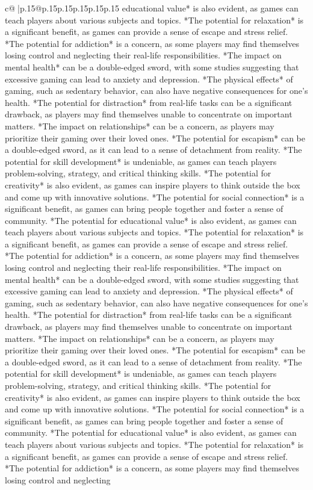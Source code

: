\documentclass{article}
\begin{document}
{\begin{supertabular}{c@{$\;$}|p{.15\linewidth}@{}p{.15\linewidth}p{.15\linewidth}p{.15\linewidth}p{.15\linewidth}p{.15\linewidth}}
{{{educational value* is also evident, as games can teach players about various subjects and topics. *The potential for relaxation* is a significant benefit, as games can provide a sense of escape and stress relief. *The potential for addiction* is a concern, as some players may find themselves losing control and neglecting their real{-}life responsibilities. *The impact on mental health* can be a double{-}edged sword, with some studies suggesting that excessive gaming can lead to anxiety and depression. *The physical effects* of gaming, such as sedentary behavior, can also have negative consequences for one's health. *The potential for distraction* from real{-}life tasks can be a significant drawback, as players may find themselves unable to concentrate on important matters. *The impact on relationships* can be a concern, as players may prioritize their gaming over their loved ones. *The potential for escapism* can be a double{-}edged sword, as it can lead to a sense of detachment from reality. *The potential for skill development* is undeniable, as games can teach players problem{-}solving, strategy, and critical thinking skills. *The potential for creativity* is also evident, as games can inspire players to think outside the box and come up with innovative solutions. *The potential for social connection* is a significant benefit, as games can bring people together and foster a sense of community. *The potential for educational value* is also evident, as games can teach players about various subjects and topics. *The potential for relaxation* is a significant benefit, as games can provide a sense of escape and stress relief. *The potential for addiction* is a concern, as some players may find themselves losing control and neglecting their real{-}life responsibilities. *The impact on mental health* can be a double{-}edged sword, with some studies suggesting that excessive gaming can lead to anxiety and depression. *The physical effects* of gaming, such as sedentary behavior, can also have negative consequences for one's health. *The potential for distraction* from real{-}life tasks can be a significant drawback, as players may find themselves unable to concentrate on important matters. *The impact on relationships* can be a concern, as players may prioritize their gaming over their loved ones. *The potential for escapism* can be a double{-}edged sword, as it can lead to a sense of detachment from reality. *The potential for skill development* is undeniable, as games can teach players problem{-}solving, strategy, and critical thinking skills. *The potential for creativity* is also evident, as games can inspire players to think outside the box and come up with innovative solutions. *The potential for social connection* is a significant benefit, as games can bring people together and foster a sense of community. *The potential for educational value* is also evident, as games can teach players about various subjects and topics. *The potential for relaxation* is a significant benefit, as games can provide a sense of escape and stress relief. *The potential for addiction* is a concern, as some players may find themselves losing control and neglecting }}}
\end{supertabular}}
\end{document}
